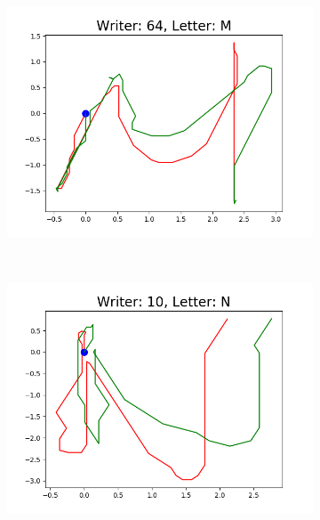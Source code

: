 \begin{figure}
\begin{subfigure}[b]{0.17\textwidth}
          \includegraphics[width=\textwidth]{images/framework/comparison_figures/M_64.png}
      \end{subfigure}
      ~
      \begin{subfigure}[b]{0.17\textwidth}
          \includegraphics[width=\textwidth]{images/framework/comparison_figures/N_10.png}
      \end{subfigure}
      ~
      \begin{subfigure}[b]{0.17\textwidth}

\end{subfigure}
\end{figure}
